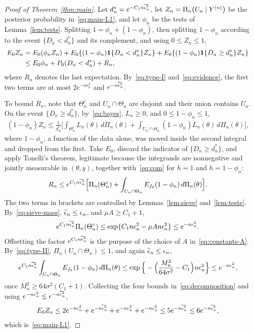 \begin{proof}[Proof of Theorem~\ref{thm:main}]
Let $d_n^*=e^{-C_1n\widetilde{\epsilon}_n^2}$, let $Z_n=\Pi_n\!\left(U_n\mid Y^{(n)}\right)$ be the posterior probability in~\eqref{eq:main-L1}, and let $\phi_n$ be the tests of Lemma~\ref{lem:tests}. Splitting $1=\phi_n+(1-\phi_n)$, then splitting $1-\phi_n$ according to the event $\{D_n<d_n^*\}$ and its complement, and using $0\leq Z_n\leq1$,
\begin{align}
E_0Z_n
&=E_0(\phi_nZ_n)
 +E_0\{(1-\phi_n)\mathbf1\{D_n<d_n^*\}Z_n\}
 +E_0\{(1-\phi_n)\mathbf1\{D_n\geq d_n^*\}Z_n\}\notag\\
&\leq E_0\phi_n+P_0(D_n<d_n^*)+R_n,
\label{eq:decomposition}
\end{align}
where $R_n$ denotes the last expectation. By~\eqref{eq:type-I} and~\eqref{eq:evidence}, the first two terms are at most $2e^{-n\epsilon_n^2}$ and $e^{-n\widetilde{\epsilon}_n^2}$.

To bound $R_n$, note that $\Theta_n^c$ and $U_n\cap\Theta_n$ are disjoint and their union contains $U_n$. On the event $\{D_n\geq d_n^*\}$, by~\eqref{eq:bayes}, $L_n\geq0$, and $0\leq1-\phi_n\leq1$,
\begin{align*}
(1-\phi_n)Z_n
\leq\frac1{d_n^*}\Big[
 \int_{\Theta_n^c}L_n(\theta)\,d\Pi_n(\theta)
 +\int_{U_n\cap\Theta_n}(1-\phi_n)L_n(\theta)\,d\Pi_n(\theta)
 \Big],
\end{align*}
where $1-\phi_n$, a function of the data alone, was moved inside the second integral and dropped from the first. Take $E_0$, discard the indicator of $\{D_n\geq d_n^*\}$, and apply Tonelli's theorem, legitimate because the integrands are nonnegative and jointly measurable in $(\theta,y)$, together with~\eqref{eq:com} for $h=1$ and $h=1-\phi_n$:
\begin{align}
R_n
\leq e^{C_1n\widetilde{\epsilon}_n^2}\Big[
\Pi_n(\Theta_n^c)
+\int_{U_n\cap\Theta_n}E_{f_\theta}(1-\phi_n)\,d\Pi_n(\theta)
\Big].
\label{eq:remainder}
\end{align}
The two terms in brackets are controlled by Lemmas~\ref{lem:sieve} and~\ref{lem:tests}. By~\eqref{eq:sieve-mass}, $\widetilde{\epsilon}_n\leq\epsilon_n$, and $\mu A\geq C_1+1$,
\begin{align}
e^{C_1n\widetilde{\epsilon}_n^2}\Pi_n(\Theta_n^c)
\leq\exp\{C_1n\epsilon_n^2-\mu An\epsilon_n^2\}
\leq e^{-n\epsilon_n^2}.
\label{eq:sieve-after-evidence}
\end{align}
Offsetting the factor $e^{C_1n\widetilde{\epsilon}_n^2}$ is the purpose of the choice of $A$ in~\eqref{eq:constants-A}. By~\eqref{eq:type-II}, $\Pi_n(U_n\cap\Theta_n)\leq1$, and again $\widetilde{\epsilon}_n\leq\epsilon_n$,
\begin{align*}
e^{C_1n\widetilde{\epsilon}_n^2}\int_{U_n\cap\Theta_n}E_{f_\theta}(1-\phi_n)\,d\Pi_n(\theta)
\leq\exp\Big\{-\Big(\frac{M_n^2}{64\sigma^2}-C_1\Big)n\epsilon_n^2\Big\}
\leq e^{-n\epsilon_n^2},
\end{align*}
once $M_n^2\geq64\sigma^2(C_1+1)$. Collecting the four bounds in~\eqref{eq:decomposition} and using $e^{-n\epsilon_n^2}\leq e^{-n\widetilde{\epsilon}_n^2}$,
\begin{align*}
E_0Z_n
\leq2e^{-n\epsilon_n^2}+e^{-n\widetilde{\epsilon}_n^2}+e^{-n\epsilon_n^2}+e^{-n\epsilon_n^2}
\leq5e^{-n\widetilde{\epsilon}_n^2}
\leq6e^{-n\widetilde{\epsilon}_n^2},
\end{align*}
which is~\eqref{eq:main-L1}.


\end{proof}
